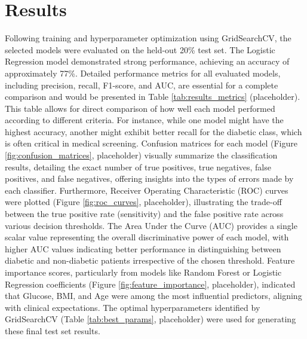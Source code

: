 \documentclass[conference]{IEEEtran}
\begin{document}
\section{Results}
Following training and hyperparameter optimization using GridSearchCV, the selected models were evaluated on the held-out 20\% test set. The Logistic Regression model demonstrated strong performance, achieving an accuracy of approximately 77\%. Detailed performance metrics for all evaluated models, including precision, recall, F1-score, and AUC, are essential for a complete comparison and would be presented in Table \ref{tab:results_metrics} (placeholder). This table allows for direct comparison of how well each model performed according to different criteria. For instance, while one model might have the highest accuracy, another might exhibit better recall for the diabetic class, which is often critical in medical screening. Confusion matrices for each model (Figure \ref{fig:confusion_matrices}, placeholder) visually summarize the classification results, detailing the exact number of true positives, true negatives, false positives, and false negatives, offering insights into the types of errors made by each classifier. Furthermore, Receiver Operating Characteristic (ROC) curves were plotted (Figure \ref{fig:roc_curves}, placeholder), illustrating the trade-off between the true positive rate (sensitivity) and the false positive rate across various decision thresholds. The Area Under the Curve (AUC) provides a single scalar value representing the overall discriminative power of each model, with higher AUC values indicating better performance in distinguishing between diabetic and non-diabetic patients irrespective of the chosen threshold. Feature importance scores, particularly from models like Random Forest or Logistic Regression coefficients (Figure \ref{fig:feature_importance}, placeholder), indicated that Glucose, BMI, and Age were among the most influential predictors, aligning with clinical expectations. The optimal hyperparameters identified by GridSearchCV (Table \ref{tab:best_params}, placeholder) were used for generating these final test set results.

\end{document}

